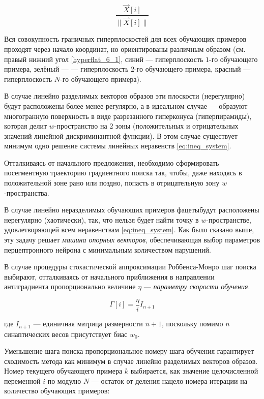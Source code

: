\documentclass{article}
\numberwithin{equation}{subsection}
\begin{document}
\begin{equation*}
    \dfrac{\vec{X}[i]}{\|\vec{X}[i]\|}
\end{equation*}

Вся совокупность граничных гиперплоскостей для всех обучающих примеров проходят через 
начало координат, но ориентированы различным образом (см. правый нижний угол 
\ref{hyperflat_6_1}, синий --- гиперплоскость $1$-го обучающего примера, зелёный ---
--- гиперплоскость $2$-го обучающего примера, красный --- гиперплоскость $N$-го 
обучающего примера).

В случае линейно разделимых векторов образов эти плоскости (\glqq нерегулярно\grqq) 
будут расположены более-менее регулярно, а в идеальном случае --- образуют 
многогранную поверхность в виде разрезанного гиперконуса (гиперпирамиды), 
которая делит $w$-пространство на 2 зоны (положительных и отрицательных значений 
линейной дискриминантной функции).
В этом случае существует минимум одно решение системы линейных неравенств 
\ref{eq:ineq_system}.

Отталкиваясь от начального предложения, необходимо сформировать посегментную траекторию 
градиентного поиска так, чтобы, даже находясь в положительной зоне рано или поздно,
попасть в отрицательную зону $w$-пространства. 

В случае линейно неразделимых обучающих примеров \glqq фацеты\grqq будут расположены
нерегулярно (хаотически), так, что нельзя будет найти точку в $w$-пространстве, 
удовлетворяющей всем неравенствам \ref{eq:ineq_system}. Как было сказано выше,
эту задачу решает \textit{машина опорных векторов}, обеспечивающая выбор параметров
перцептронного нейрона с минимальным количеством нарушений.

В случае процедуры стохастической аппроксимации Роббенса-Монро шаг поиска выбирают,
отталкиваясь от начального приближения в направлении антиградиента пропорционально
величине $\eta$ --- \textit{параметру скорости обучения}.

\begin{equation}
    \Gamma[i] = \dfrac{\eta}{i} I_{n+1}
\end{equation}

\noindent
где $I_{n+1}$ --- единичная матрица размерности $n+1$, поскольку помимо $n$ синаптических
весов присутствует биас $w_0$.

Уменьшение шага поиска пропорциональное номеру шага обучения гарантирует сходимость метода
как минимум в случае линейно разделимых векторов образов.
Номер текущего обучающего примера $k$ выбирается, как значение целочисленной переменной $i$ 
по модулю $N$ --- остаток от деления нацело номера итерации на количество обучающих 
примеров:
\end{document}

